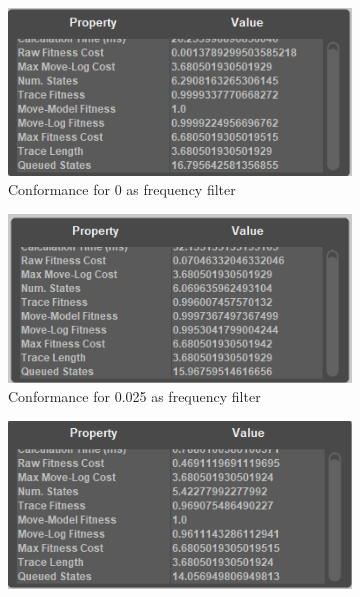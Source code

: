 \begin{figure}[!htbp]
\centering
\begin{subfigure}{.3\textwidth}
  \centering
  \includegraphics[width=\linewidth]{RejCon0.PNG}
  \caption{Conformance for 0 as frequency filter}
  \label{fig:RejCon0}
\end{subfigure}%
\begin{subfigure}{.3\textwidth}
  \centering
  \includegraphics[width=\linewidth]{RejCon0-025.PNG}
  \caption{Conformance for 0.025 as frequency filter}
  \label{fig:RejCon0-025}
\end{subfigure}
\begin{subfigure}{.3\textwidth}
  \centering
  \includegraphics[width=\linewidth]{RejCon0-1.PNG}

\end{subfigure}
\end{figure}
